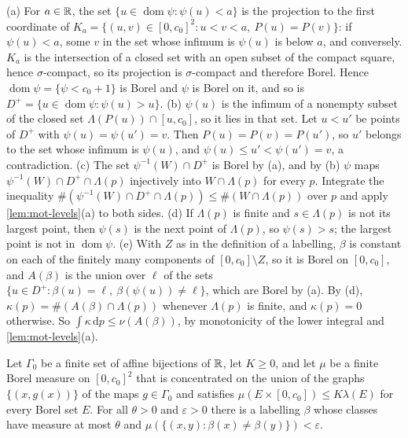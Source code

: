 \begin{informalproof}
(a) For $a\in\mathbb{R}$, the set $\{u\in\operatorname{dom}\psi:\psi(u)<a\}$ is the projection to the first coordinate of
$K_a=\{(u,v)\in[0,c_0]^2:u<v<a,\ P(u)=P(v)\}$: if $\psi(u)<a$, some $v$ in the set whose infimum is $\psi(u)$ is below
$a$, and conversely. $K_a$ is the intersection of a closed set with an open subset of the compact square, hence
$\sigma$-compact, so its projection is $\sigma$-compact and therefore Borel. Hence
$\operatorname{dom}\psi=\{\psi<c_0+1\}$ is Borel and $\psi$ is Borel on it, and so is
$D^+=\{u\in\operatorname{dom}\psi:\psi(u)>u\}$.
(b) $\psi(u)$ is the infimum of a nonempty subset of the closed set $\Lambda(P(u))\cap[u,c_0]$, so it lies in that set.
Let $u<u'$ be points of $D^+$ with $\psi(u)=\psi(u')=v$. Then $P(u)=P(v)=P(u')$, so $u'$ belongs to the set whose
infimum is $\psi(u)$, and $\psi(u)\le u'<\psi(u')=v$, a contradiction.
(c) The set $\psi^{-1}(W)\cap D^+$ is Borel by (a), and by (b) $\psi$ maps $\psi^{-1}(W)\cap D^+\cap\Lambda(p)$
injectively into $W\cap\Lambda(p)$ for every $p$. Integrate the inequality
$\#(\psi^{-1}(W)\cap D^+\cap\Lambda(p))\le\#(W\cap\Lambda(p))$ over $p$ and apply \cref{lem:mot-levels}(a) to both sides.
(d) If $\Lambda(p)$ is finite and $s\in\Lambda(p)$ is not its largest point, then $\psi(s)$ is the next point of
$\Lambda(p)$, so $\psi(s)>s$; the largest point is not in $\operatorname{dom}\psi$.
(e) With $Z$ as in the definition of a labelling, $\beta$ is constant on each of the finitely many components of
$[0,c_0]\setminus Z$, so it is Borel on $[0,c_0]$, and $A(\beta)$ is the union over $\ell$ of the sets
$\{u\in D^+:\beta(u)=\ell,\ \beta(\psi(u))\ne\ell\}$, which are Borel by (a). By (d),
$\kappa(p)=\#(A(\beta)\cap\Lambda(p))$ whenever $\Lambda(p)$ is finite, and $\kappa(p)=0$ otherwise. So
$\int\kappa\,\mathrm dp\le\nu(A(\beta))$, by monotonicity of the lower integral and \cref{lem:mot-levels}(a).
\end{informalproof}

\begin{lemma}\label{lem:mot-finite-measure}
Let $\Gamma_0$ be a finite set of affine bijections of $\mathbb{R}$, let $K\ge0$, and let $\mu$ be a finite Borel measure on
$[0,c_0]^2$ that is concentrated on the union of the graphs $\{(x,g(x))\}$ of the maps $g\in\Gamma_0$ and satisfies
$\mu(E\times[0,c_0])\le K\lambda(E)$ for every Borel set $E$. For all $\theta>0$ and $\varepsilon>0$ there is a
labelling $\beta$ whose classes have measure at most $\theta$ and $\mu(\{(x,y):\beta(x)\ne\beta(y)\})<\varepsilon$.
\end{lemma}

